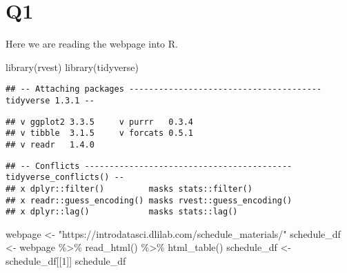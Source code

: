 \documentclass[
]{article}
\newenvironment{Shaded}{\begin{snugshade}}{\end{snugshade}}
\newcommand{\DecValTok}[1]{\textcolor[rgb]{0.00,0.00,0.81}{#1}}
\newcommand{\FunctionTok}[1]{\textcolor[rgb]{0.00,0.00,0.00}{#1}}
\newcommand{\NormalTok}[1]{#1}
\newcommand{\OtherTok}[1]{\textcolor[rgb]{0.56,0.35,0.01}{#1}}
\newcommand{\SpecialCharTok}[1]{\textcolor[rgb]{0.00,0.00,0.00}{#1}}
\newcommand{\StringTok}[1]{\textcolor[rgb]{0.31,0.60,0.02}{#1}}
\begin{document}
\hypertarget{q1}{%
\section{Q1}\label{q1}}

Here we are reading the webpage into R.

\begin{Shaded}
\begin{Highlighting}[]
\FunctionTok{library}\NormalTok{(rvest)}
\FunctionTok{library}\NormalTok{(tidyverse)}
\end{Highlighting}
\end{Shaded}

\begin{verbatim}
## -- Attaching packages --------------------------------------- tidyverse 1.3.1 --
\end{verbatim}

\begin{verbatim}
## v ggplot2 3.3.5     v purrr   0.3.4
## v tibble  3.1.5     v forcats 0.5.1
## v readr   1.4.0
\end{verbatim}

\begin{verbatim}
## -- Conflicts ------------------------------------------ tidyverse_conflicts() --
## x dplyr::filter()         masks stats::filter()
## x readr::guess_encoding() masks rvest::guess_encoding()
## x dplyr::lag()            masks stats::lag()
\end{verbatim}

\begin{Shaded}
\begin{Highlighting}[]
\NormalTok{webpage }\OtherTok{\textless{}{-}} \StringTok{"https://introdatasci.dlilab.com/schedule\_materials/"}
\NormalTok{schedule\_df }\OtherTok{\textless{}{-}}\NormalTok{ webpage }\SpecialCharTok{\%\textgreater{}\%} \FunctionTok{read\_html}\NormalTok{() }\SpecialCharTok{\%\textgreater{}\%} \FunctionTok{html\_table}\NormalTok{()}
\NormalTok{schedule\_df }\OtherTok{\textless{}{-}}\NormalTok{ schedule\_df[[}\DecValTok{1}\NormalTok{]]}
\NormalTok{schedule\_df}
\end{Highlighting}
\end{Shaded}
\end{document}
